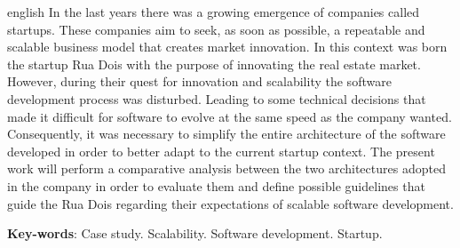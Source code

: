 \begin{resumo}[Abstract]
 \begin{otherlanguage*}{english}
  In the last years there was a growing emergence of companies called startups.
  These companies aim to seek, as soon as possible, a repeatable and scalable
  business model that creates market innovation. In this context was born the
  startup Rua Dois with the purpose of innovating the real estate market. 
  However, during their quest for innovation and scalability the software
  development process was disturbed. Leading to some technical decisions that
  made it difficult for software to evolve at the same speed as the company wanted.
  Consequently, it was necessary to simplify the entire architecture of the
  software developed in order to better adapt to the current startup context. The
  present work will perform a comparative analysis between the two architectures
  adopted in the company in order to evaluate them and define possible guidelines
  that guide the Rua Dois regarding their expectations of scalable software
  development.
   \vspace{\onelineskip}
 
   \noindent 
   \textbf{Key-words}: Case study. Scalability. Software development. Startup.
 \end{otherlanguage*}
\end{resumo}
